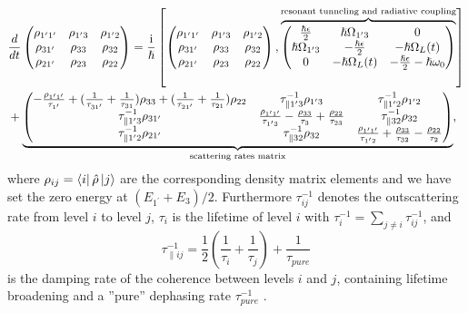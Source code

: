\documentclass[10pt]{article}
\begin{document}
	\begin{align}
		&  \frac{d}{dt}%
		\begin{pmatrix}
			\rho_{1^{\prime}1^{\prime}} & \rho_{1^{\prime}3} & \rho_{1^{\prime}2}\\
			\rho_{31^{\prime}} & \rho_{33} & \rho_{32}\\
			\rho_{21^{\prime}} & \rho_{23} & \rho_{22}%
		\end{pmatrix}
		=\frac{\mathrm{i}}{\hslash}\left[
		\begin{pmatrix}
			\rho_{1^{\prime}1^{\prime}} & \rho_{1^{\prime}3} & \rho_{1^{\prime}2}\\
			\rho_{31^{\prime}} & \rho_{33} & \rho_{32}\\
			\rho_{21^{\prime}} & \rho_{23} & \rho_{22}%
		\end{pmatrix}
		,\overbrace{%
			\begin{pmatrix}
				\frac{\hslash\epsilon}{2} & \hslash\Omega_{1^{\prime}3} & 0\\
				\hslash\Omega_{1^{\prime}3} & -\frac{\hslash\epsilon}{2} & -\hslash\Omega_{L}(t)\\
				0 & -\hslash\Omega_{L}(t) & -\frac{\hslash\epsilon}{2}-\hslash\omega_{0}%
			\end{pmatrix}
		}^{\text{resonant tunneling and radiative coupling}}\right] \nonumber\\
		&  +\underbrace{%
			\begin{pmatrix}
				-\frac{\rho_{1^{\prime}1^{\prime}}}{\tau_{1^{\prime}}}+(\frac{1}%
				{\tau_{31^{\prime}}}+\frac{1}{\tau_{31}})\rho_{33}+(\frac{1}{\tau_{21^{\prime
						}}}+\frac{1}{\tau_{21}})\rho_{22} & \tau_{\parallel1^{\prime}3}^{-1}%
						\rho_{1^{\prime}3} & \tau_{\parallel1^{\prime}2}^{-1}\rho_{1^{\prime}2}\\
						\tau_{\parallel1^{\prime}3}^{-1}\rho_{31^{\prime}} & \frac{\rho_{1^{\prime
								}1^{\prime}}}{\tau_{1^{\prime}3}}-\frac{\rho_{33}}{\tau_{3}}+\frac{\rho_{22}%
						}{\tau_{23}} & \tau_{\parallel32}^{-1}\rho_{32}\\
						\tau_{\parallel1^{\prime}2}^{-1}\rho_{21^{\prime}} & \tau_{\parallel32}%
						^{-1}\rho_{32} & \frac{\rho_{1^{\prime}1^{\prime}}}{\tau_{1^{\prime}2}}%
						+\frac{\rho_{33}}{\tau_{32}}-\frac{\rho_{22}}{\tau_{2}}%
					\end{pmatrix}
				}_{\text{scattering rates matrix}}, \label{eq:vonNeumannmatrix}%
			\end{align}
			where $\rho_{ij}=\Bra{i}\hat{\rho}\Ket{j}$ are the corresponding density
			matrix elements and we have set the zero energy at $(E_{1^{\prime}}+E_{3})/2$.
			Furthermore $\tau_{ij}^{-1}$ denotes the outscattering rate from level $i$ to
			level $j$, $\tau_{i}$ is the lifetime of level $i$ with $\tau_{i}^{-1}%
			=\sum_{j\neq i}\tau_{ij}^{-1}$, and
			\[
			\tau_{\parallel ij}^{-1}=\frac{1}{2}\left(  \frac{1}{\tau_{i}}+\frac{1}%
			{\tau_{j}}\right)  +\frac{1}{\tau_{pure}}%
			\]
			is the damping rate of the coherence between levels $i$ and $j$, containing
			lifetime broadening and a ''pure'' dephasing rate $\tau_{pure}^{-1}$
			\cite{callebaut2005importance}.
			
\end{document}
